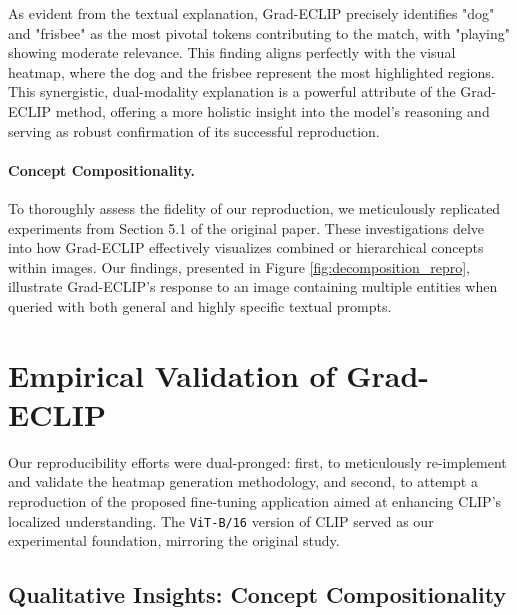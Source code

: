 \documentclass[10pt]{article} %
\begin{document}
As evident from the textual explanation, Grad-ECLIP precisely identifies "dog" and "frisbee" as the most pivotal tokens contributing to the match, with "playing" showing moderate relevance. This finding aligns perfectly with the visual heatmap, where the dog and the frisbee represent the most highlighted regions. This synergistic, dual-modality explanation is a powerful attribute of the Grad-ECLIP method, offering a more holistic insight into the model's reasoning and serving as robust confirmation of its successful reproduction.

\paragraph{Concept Compositionality.}
To thoroughly assess the fidelity of our reproduction, we meticulously replicated experiments from Section 5.1 of the original paper. These investigations delve into how Grad-ECLIP effectively visualizes combined or hierarchical concepts within images. Our findings, presented in Figure \ref{fig:decomposition_repro}, illustrate Grad-ECLIP's response to an image containing multiple entities when queried with both general and highly specific textual prompts.

\section{Empirical Validation of Grad-ECLIP}
\label{repro_efforts} %

Our reproducibility efforts were dual-pronged: first, to meticulously re-implement and validate the heatmap generation methodology, and second, to attempt a reproduction of the proposed fine-tuning application aimed at enhancing CLIP's localized understanding. The \texttt{ViT-B/16} version of CLIP served as our experimental foundation, mirroring the original study.

\subsection{Qualitative Insights: Concept Compositionality}
\end{document}
